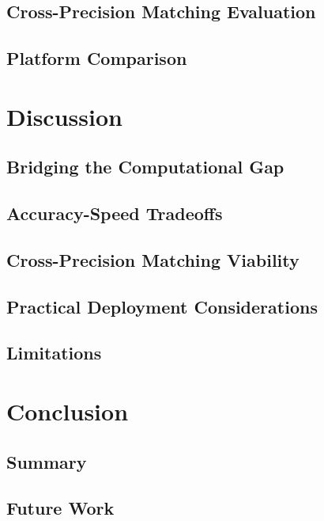 \documentclass[12pt]{article}
\begin{document}
\subsection{Cross-Precision Matching Evaluation}

\subsection{Platform Comparison}


\newpage
\section{Discussion}

\subsection{Bridging the Computational Gap}

\subsection{Accuracy-Speed Tradeoffs}

\subsection{Cross-Precision Matching Viability}

\subsection{Practical Deployment Considerations}

\subsection{Limitations}
\newpage
\section{Conclusion}

\subsection{Summary}

\subsection{Future Work}
\newpage


\end{document}
